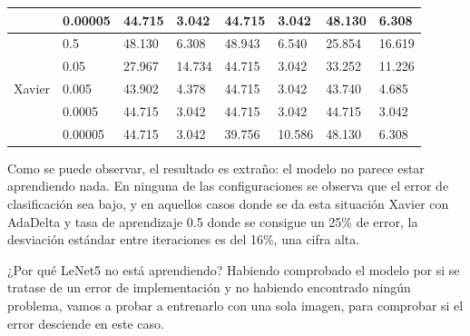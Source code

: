 \begin{table}[H]
\begin{tabular}{cl|llllll|}
\multicolumn{1}{c|}{}                                                         & 0.00005                                                                             & 44.715 & \multicolumn{1}{l|}{3.042}  & 44.715 & \multicolumn{1}{l|}{3.042}  & 48.130        & 6.308         \\ \hline
\multicolumn{1}{c|}{\multirow{5}{*}{Xavier}}                                  & 0.5                                                                                 & 48.130 & \multicolumn{1}{l|}{6.308}  & 48.943 & \multicolumn{1}{l|}{6.540}  & 25.854        & 16.619        \\
\multicolumn{1}{c|}{}                                                         & 0.05                                                                                & 27.967 & \multicolumn{1}{l|}{14.734} & 44.715 & \multicolumn{1}{l|}{3.042}  & 33.252        & 11.226        \\
\multicolumn{1}{c|}{}                                                         & 0.005                                                                               & 43.902 & \multicolumn{1}{l|}{4.378}  & 44.715 & \multicolumn{1}{l|}{3.042}  & 43.740        & 4.685         \\
\multicolumn{1}{c|}{}                                                         & 0.0005                                                                              & 44.715 & \multicolumn{1}{l|}{3.042}  & 44.715 & \multicolumn{1}{l|}{3.042}  & 44.715        & 3.042         \\
\multicolumn{1}{c|}{}                                                         & 0.00005                                                                             & 44.715 & \multicolumn{1}{l|}{3.042}  & 39.756 & \multicolumn{1}{l|}{10.586} & 48.130        & 6.308        
\end{tabular}
\end{table}

Como se puede observar, el resultado es extraño: el modelo no parece estar aprendiendo nada. En ninguna de las configuraciones se observa que el error de clasificación sea bajo, y en aquellos casos donde se da esta situación Xavier con AdaDelta y tasa de aprendizaje 0.5 donde se consigue un 25\% de error, la desviación estándar entre iteraciones es del 16\%, una cifra alta. 





¿Por qué LeNet5 no está aprendiendo? Habiendo comprobado el modelo por si se tratase de un error de implementación y no habiendo encontrado ningún problema, vamos a probar a entrenarlo con una sola imagen, para comprobar si el error desciende en este caso.





